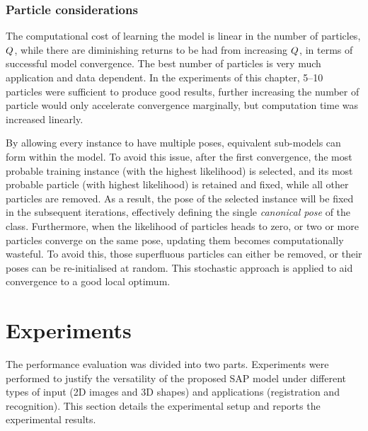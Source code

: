 \subsubsection{Particle considerations}
The computational cost of learning the model is linear in the number of particles, $Q$, while there are diminishing returns to be had from increasing $Q$, in terms of successful model convergence. The best number of particles is very much application and data dependent. In the experiments of this chapter, 5--10 particles were sufficient to produce good results, further increasing the number of particle would only accelerate convergence marginally, but computation time was increased linearly. 

By allowing every instance to have multiple poses, equivalent sub-models can form within the model.
To avoid this issue, after the first convergence, the most probable training instance (with the highest likelihood) is selected, and its most probable particle (with highest likelihood) is retained and fixed, while all other particles are removed. As a result, the pose of the selected instance will be fixed in the subsequent iterations, effectively defining the single \emph{canonical pose} of the class. 
Furthermore, when the likelihood of particles heads to zero, or two or more particles converge on the same pose, updating them becomes computationally wasteful. To avoid this, those superfluous particles can either be removed, or their poses can be re-initialised at random. This stochastic approach is applied to aid convergence to a good local optimum.  


\section{Experiments}
\label{sec/reg/experiments}



The performance evaluation was divided into two parts. Experiments were performed to justify the versatility of the proposed SAP model under different types of input (2D images and 3D shapes) and applications (registration and recognition). This section details the experimental setup and reports the experimental results.

